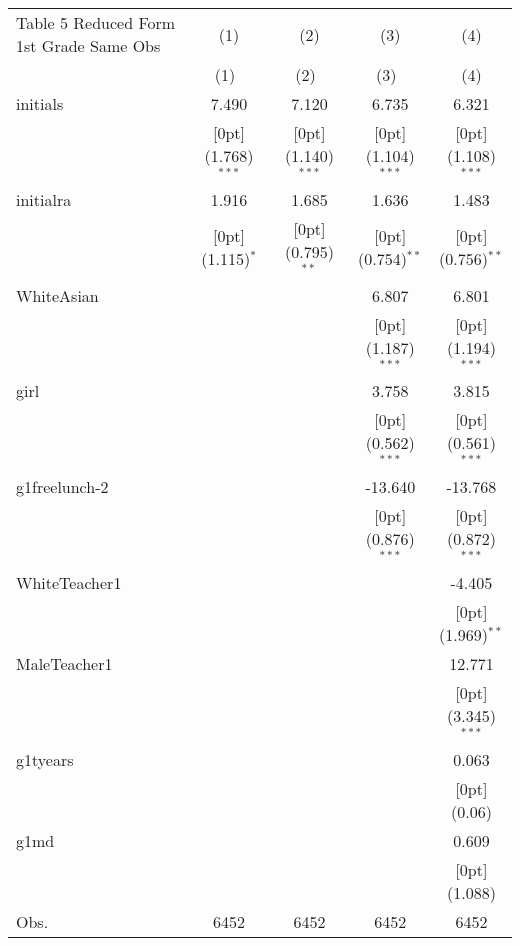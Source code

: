 \documentclass[a4paper,11pt]{article}
\begin{document}
\begin{table}
	\small
\begin{tabular*}{\textwidth}{@{\extracolsep{\fill}}lcccc}				
	Table 5 Reduced Form 1st Grade Same Obs & \multicolumn{1}{c}{(1)} &	\multicolumn{1}{c}{(2)} &	\multicolumn{1}{c}{(3)} &	\multicolumn{1}{c}{(4)} \\
	\cline{2-5}				
	& \multicolumn{1}{c}{(1)\mbox{\ }} &	\multicolumn{1}{c}{(2)\mbox{\ }} &	\multicolumn{1}{c}{(3)\mbox{\ }} &	\multicolumn{1}{c}{(4)} \\
	\hline				
	initials &	7.490 &	7.120 &	6.735 &	6.321 \\
	&	\raisebox{.7ex}[0pt]{\scriptsize (1.768)$^{***}$} &	\raisebox{.7ex}[0pt]{\scriptsize (1.140)$^{***}$} &	\raisebox{.7ex}[0pt]{\scriptsize (1.104)$^{***}$} &	\raisebox{.7ex}[0pt]{\scriptsize (1.108)$^{***}$} \\
	initialra &	1.916 &	1.685 &	1.636 &	1.483 \\
	&	\raisebox{.7ex}[0pt]{\scriptsize (1.115)$^{*}$} &	\raisebox{.7ex}[0pt]{\scriptsize (0.795)$^{**}$} &	\raisebox{.7ex}[0pt]{\scriptsize (0.754)$^{**}$} &	\raisebox{.7ex}[0pt]{\scriptsize (0.756)$^{**}$} \\
	WhiteAsian &	&	&	6.807 &	6.801 \\
	&	&	&	\raisebox{.7ex}[0pt]{\scriptsize (1.187)$^{***}$} &	\raisebox{.7ex}[0pt]{\scriptsize (1.194)$^{***}$} \\
	girl &	&	&	3.758 &	3.815 \\
	&	&	&	\raisebox{.7ex}[0pt]{\scriptsize (0.562)$^{***}$} &	\raisebox{.7ex}[0pt]{\scriptsize (0.561)$^{***}$} \\
	g1freelunch-2 &	&	&	-13.640 &	-13.768 \\
	&	&	&	\raisebox{.7ex}[0pt]{\scriptsize (0.876)$^{***}$} &	\raisebox{.7ex}[0pt]{\scriptsize (0.872)$^{***}$} \\
	WhiteTeacher1 &	&	&	&	-4.405 \\
	&	&	&	&	\raisebox{.7ex}[0pt]{\scriptsize (1.969)$^{**}$} \\
	MaleTeacher1 &	&	&	&	12.771 \\
	&	&	&	&	\raisebox{.7ex}[0pt]{\scriptsize (3.345)$^{***}$} \\
	g1tyears &	&	&	&	0.063 \\
	&	&	&	&	\raisebox{.7ex}[0pt]{\scriptsize (0.06)} \\
	g1md &	&	&	&	0.609 \\
	&	&	&	&	\raisebox{.7ex}[0pt]{\scriptsize (1.088)} \\
	Obs. &	6452 &	6452 &	6452 &	6452 \\
	\hline\hline				
\end{tabular*}	
\end{table}	
\end{document}
